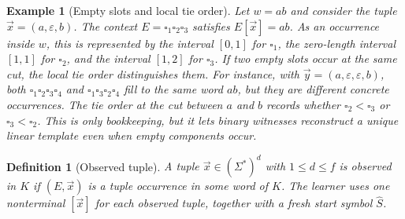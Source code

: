 \documentclass[11pt,a4paper]{article}
\newtheorem{definition}[theorem]{Definition}
\newtheorem{example}[theorem]{Example}
\theoremstyle{remark}
\newcommand{\tuple}[1]{\vec{#1}}
\newcommand{\blank}{\square}
\newcommand{\eps}{\varepsilon}
\begin{document}
\begin{example}[Empty slots and local tie order]
\label{ex:empty-slots}
Let \(w=ab\) and consider the tuple \(\tuple x=(a,\eps,b)\).  The context
\(E=\blank_1\blank_2\blank_3\) satisfies \(E[\tuple x]=ab\).  As an occurrence
inside \(w\), this is represented by the interval \([0,1]\) for
\(\blank_1\), the zero-length interval \([1,1]\) for \(\blank_2\), and the
interval \([1,2]\) for \(\blank_3\).  If two empty slots occur at the same cut,
the local tie order distinguishes them.  For instance, with
\(\tuple y=(a,\eps,\eps,b)\), both
\(\blank_1\blank_2\blank_3\blank_4\) and
\(\blank_1\blank_3\blank_2\blank_4\) fill to the same word \(ab\), but they are
different concrete occurrences.  The tie order at the cut between \(a\) and
\(b\) records whether \(\blank_2<\blank_3\) or \(\blank_3<\blank_2\).  This is
only bookkeeping, but it lets binary witnesses reconstruct a unique linear
template even when empty components occur.
\end{example}

\begin{definition}[Observed tuple]
\label{def:observed-tuple}
A tuple \(\tuple x\in(\Sigma^*)^d\) with \(1\le d\le f\) is \emph{observed in
\(K\)} if \((E,\tuple x)\) is a tuple occurrence in some word of \(K\).  The
learner uses one nonterminal \([\tuple x]\) for each observed tuple, together
with a fresh start symbol \(\widehat S\).
\end{definition}
\end{document}
